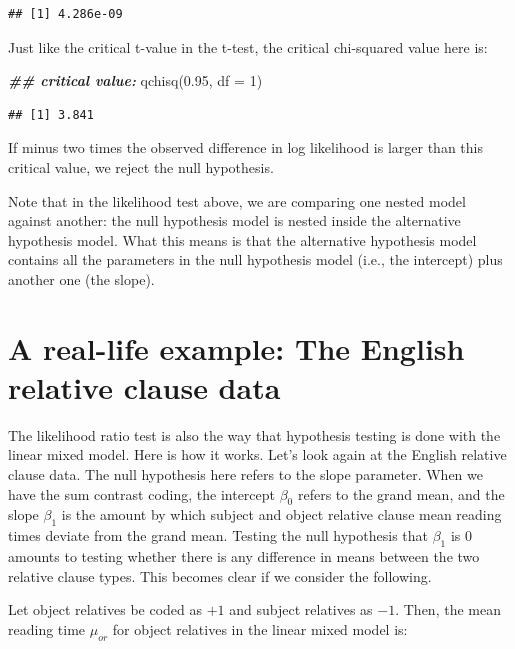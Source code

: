 \documentclass[
  12pt,
]{krantz}
\newenvironment{Shaded}{\begin{snugshade}}{\end{snugshade}}
\newcommand{\AttributeTok}[1]{\textcolor[rgb]{0.77,0.63,0.00}{#1}}
\newcommand{\DecValTok}[1]{\textcolor[rgb]{0.00,0.00,0.81}{#1}}
\newcommand{\DocumentationTok}[1]{\textcolor[rgb]{0.56,0.35,0.01}{\textbf{\textit{#1}}}}
\newcommand{\FloatTok}[1]{\textcolor[rgb]{0.00,0.00,0.81}{#1}}
\newcommand{\FunctionTok}[1]{\textcolor[rgb]{0.00,0.00,0.00}{#1}}
\newcommand{\NormalTok}[1]{#1}
\theoremstyle{definition}
\theoremstyle{definition}
\theoremstyle{definition}
\theoremstyle{definition}
\theoremstyle{remark}
\begin{document}
\begin{verbatim}
## [1] 4.286e-09
\end{verbatim}

Just like the critical t-value in the t-test, the critical chi-squared value here is:

\begin{Shaded}
\begin{Highlighting}[]
\DocumentationTok{\#\# critical value:}
\FunctionTok{qchisq}\NormalTok{(}\FloatTok{0.95}\NormalTok{, }\AttributeTok{df =} \DecValTok{1}\NormalTok{)}
\end{Highlighting}
\end{Shaded}

\begin{verbatim}
## [1] 3.841
\end{verbatim}

If minus two times the observed difference in log likelihood is larger than this critical value, we reject the null hypothesis.

Note that in the likelihood test above, we are comparing one nested model against another: the null hypothesis model is nested inside the alternative hypothesis model. What this means is that the alternative hypothesis model contains all the parameters in the null hypothesis model (i.e., the intercept) plus another one (the slope).

\hypertarget{a-real-life-example-the-english-relative-clause-data}{%
\section{A real-life example: The English relative clause data}\label{a-real-life-example-the-english-relative-clause-data}}

The likelihood ratio test is also the way that hypothesis testing is done with the linear mixed model. Here is how it works. Let's look again at the \citet{grodner} English relative clause data. The null hypothesis here refers to the slope parameter. When we have the sum contrast coding, the intercept \(\beta_0\) refers to the grand mean, and the slope \(\beta_1\) is the amount by which subject and object relative clause mean reading times deviate from the grand mean. Testing the null hypothesis that \(\beta_1\) is 0 amounts to testing whether there is any difference in means between the two relative clause types. This becomes clear if we consider the following.

Let object relatives be coded as \(+1\) and subject relatives as \(-1\). Then, the mean reading time \(\mu_{or}\) for object relatives in the linear mixed model is:
\end{document}
